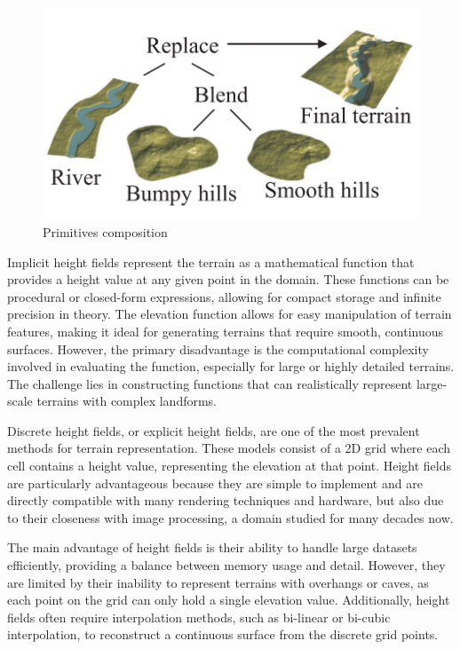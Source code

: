 
\begin{figure}
    \includegraphics[width=\linewidth]{primitives_representation.png}
    \caption{Primitives composition}
    \label{fig:erosion_primitives-representation}
\end{figure}

Implicit height fields represent the terrain as a mathematical function that provides a height value at any given point in the domain. These functions can be procedural or closed-form expressions, allowing for compact storage and infinite precision in theory. The elevation function allows for easy manipulation of terrain features, making it ideal for generating terrains that require smooth, continuous surfaces. However, the primary disadvantage is the computational complexity involved in evaluating the function, especially for large or highly detailed terrains. The challenge lies in constructing functions that can realistically represent large-scale terrains with complex landforms.

Discrete height fields, or explicit height fields, are one of the most prevalent methods for terrain representation. These models consist of a 2D grid where each cell contains a height value, representing the elevation at that point. Height fields are particularly advantageous because they are simple to implement and are directly compatible with many rendering techniques and hardware, but also due to their closeness with image processing, a domain studied for many decades now.

The main advantage of height fields is their ability to handle large datasets efficiently, providing a balance between memory usage and detail. However, they are limited by their inability to represent terrains with overhangs or caves, as each point on the grid can only hold a single elevation value. Additionally, height fields often require interpolation methods, such as bi-linear or bi-cubic interpolation, to reconstruct a continuous surface from the discrete grid points. 

